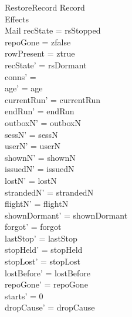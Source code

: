 \documentclass[a4paper,10pt,fleqn]{article}
\begin{document}
\begin{schema}{RestoreRecord}
  \Delta Record \\
  \Xi Effects \\
  \Delta Mail
  \where
  recState = rsStopped \\
  repoGone = zfalse \\
  rowPresent = ztrue \\
  recState' = rsDormant \\
  conns' = \emptyset \\
  age' = age \\
  currentRun' = currentRun \\
  endRun' = endRun \\
  outboxN' = outboxN \\
  sessN' = sessN \\
  userN' = userN \\
  shownN' = shownN \\
  issuedN' = issuedN \\
  lostN' = lostN \\
  strandedN' = strandedN \\
  flightN' = flightN \\
  shownDormant' = shownDormant \\
  forgot' = forgot \\
  lastStop' = lastStop \\
  stopHeld' = stopHeld \\
  stopLost' = stopLost \\
  lostBefore' = lostBefore \\
  repoGone' = repoGone \\
  starts' = 0 \\
  dropCause' = dropCause
\end{schema}
\end{document}
